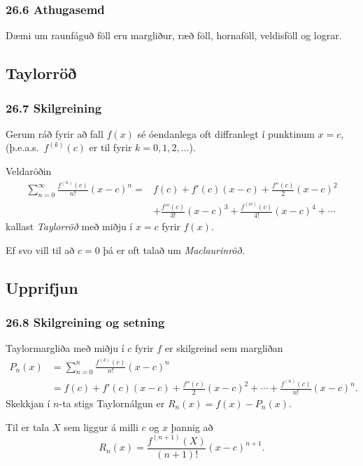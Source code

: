 \pause

\subsubsection{26.6 Athugasemd}
 Dæmi um raunfáguð föll eru margliður, ræð föll, hornaföll, veldisföll
og lograr.





\subsection[t]{Taylorröð}
 \subsubsection{26.7 Skilgreining}
Gerum ráð fyrir að fall $f(x)$ sé óendanlega oft diffranlegt í
punktinum $x=c$, \pause (þ.e.a.s.~$f^{(k)}(c)$ er til fyrir $k=0, 1, 2,
\ldots$).  

\pause

Veldaröðin 
\begin{align*}
\sum_{n=0}^\infty \frac{f^{(n)}(c)}{n!}(x-c)^n = & f(c)+f'(c)(x-c)+
\frac{f''(c)}{2}(x-c)^2 \\ & + \frac{f'''(c)}{3!}(x-c)^3 
 + \frac{f^{(iv)}(c)}{4!}(x-c)^4 + \cdots 
\end{align*}
kallast {\em Taylorröð} með miðju í $x=c$ fyrir $f(x)$. \pause 

Ef svo vill til að $c=0$ þá er oft talað um {\em Maclaurinröð}.



\subsection[t]{Upprifjun}
 \subsubsection{26.8 Skilgreining og setning}   Taylormargliða með miðju í $c$ fyrir $f$ er
skilgreind sem margliðan
\begin{align*}
	P_n(x)& =\sum_{n=0}^n \frac{f^{(k)}(c)}{n!}(x-c)^n \\
	&=f(c)+f'(c)(x-c)+ \frac{f''(c)}{2}(x-c)^2+\cdots+\frac{f^{(n)}(c)}{n!}(x-c)^n.
\end{align*}
\pause 
Skekkjan í $n$-ta stigs Taylornálgun er
$R_n(x)=f(x)-P_n(x)$. \pause 

Til er tala $X$ sem liggur á milli $c$ og $x$
þannig að 
$$
R_n(x)=\frac{f^{(n+1)}(X)}{(n+1)!}(x-c)^{n+1}.
$$



